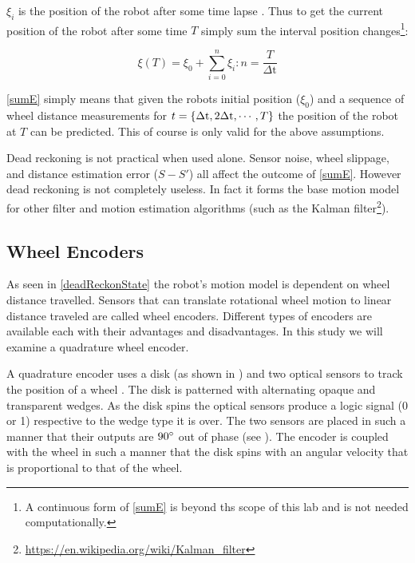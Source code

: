 \documentclass[main.tex]{subfiles}
\begin{document}
$\xi_{i}$ is the position of the robot after some time lapse \delt. Thus to get
the current position of the robot after some time $T$ simply sum the interval
position changes\footnote{A continuous form of \eqref{sumE} is beyond ths scope
of this lab and is not needed computationally.}: 

\begin{equation}
\label{eq:sumE}
\xi(T) = \xi_0 + \sum^{n}_{i=0} \xi_{i} : n = \frac{T}{\Delta\mathrm{t}}
\end{equation}

\eqref{sumE} simply means that given the robots initial position ($\xi_0$) and a sequence
of wheel distance measurements for $t=\{\Delta\mathrm{t},2\Delta\mathrm{t},\cdots,T\}$ the position of
the robot at $T$ can be predicted. This of course is only valid for the above
assumptions.

Dead reckoning is not practical when used alone. Sensor noise, wheel slippage,
and distance estimation error ($S-S\mathrm{'}$) all affect the outcome of
\eqref{sumE}. However dead reckoning is not completely useless. In fact it forms
the base motion model for other filter and motion estimation algorithms (such as
the Kalman filter\footnote{\url{https://en.wikipedia.org/wiki/Kalman_filter}}).

\subsection{Wheel Encoders}

As seen in \eqref{deadReckonState} the robot's motion model is dependent on
wheel distance travelled. Sensors that can translate rotational wheel motion to
linear distance traveled are called wheel encoders. Different types of encoders
are available each with their advantages and disadvantages. In this study we
will examine a quadrature wheel encoder. 

A quadrature encoder uses a disk (as shown in ) and two
optical sensors to track the position of a wheel \cite{Wise99}. The disk is
patterned with alternating opaque and transparent wedges. As the disk spins the
optical sensors produce a logic signal (0 or 1) respective to the wedge type it
is over. The two sensors are placed in such a manner that their outputs are
$90^\circ$ out of phase (see ). The encoder is coupled with the
wheel in such a manner that the disk spins with an angular velocity that is
proportional to that of the wheel.
\end{document}
